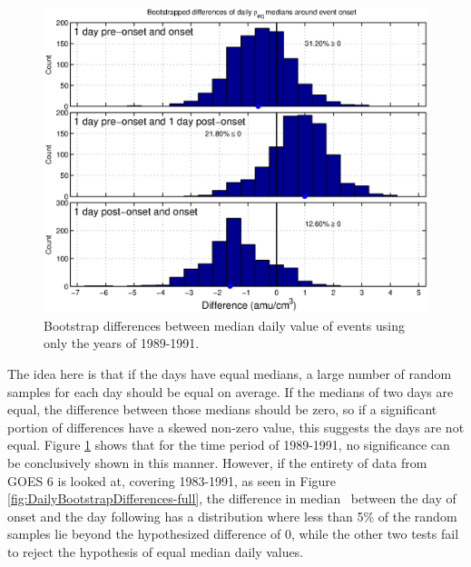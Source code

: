 \begin{figure}[htp!]
	\centering
	\includegraphics[width=1\linewidth]{Figures/DailyBootstrapDifferences-GOES6-case10}
	\caption{Bootstrap differences between median daily value of events using only the years of 1989-1991.}
	\label{fig:DailyBootstrapDifferences}
\end{figure}


The idea here is that if the days have equal medians, a large number of random samples for each day should be equal on average. If the medians of two days are equal, the difference between those medians should be zero, so if a significant portion of differences have a skewed non-zero value, this suggests the days are not equal. Figure \ref{fig:DailyBootstrapDifferences} shows that for the time period of 1989-1991, no significance can be conclusively shown in this manner. However, if the entirety of data from GOES 6 is looked at, covering 1983-1991, as seen in Figure \ref{fig:DailyBootstrapDifferences-full}, the difference in median \req\ between the day of onset and the day following has a distribution where less than 5\% of the random samples lie beyond the hypothesized difference of 0, while the other two tests fail to reject the hypothesis of equal median daily values.  

